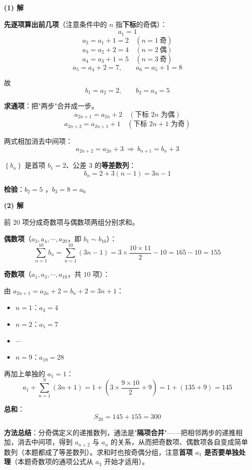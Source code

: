 \par\medskip

\textbf{(1) 解}

\textbf{先逐项算出前几项}（注意条件中的 $n$ 指\textbf{下标}的奇偶）：
\[a_1=1\]
\[a_2=a_1+1=2\quad(n=1\ \text{奇})\]
\[a_3=a_2+2=4\quad(n=2\ \text{偶})\]
\[a_4=a_3+1=5\quad(n=3\ \text{奇})\]
\[a_5=a_4+2=7,\qquad a_6=a_5+1=8\]

故
\[b_1=a_2=2,\qquad b_2=a_4=5\]

\textbf{求通项}：把"两步"合并成一步。
\[a_{2n+1}=a_{2n}+2\quad(\text{下标 }2n\text{ 为偶})\]
\[a_{2n+2}=a_{2n+1}+1\quad(\text{下标 }2n+1\text{ 为奇})\]

两式相加消去中间项：
\[a_{2n+2}=a_{2n}+3\ \Longrightarrow\ b_{n+1}=b_n+3\]

$\left\{b_n\right\}$ 是首项 $b_1=2$、公差 $3$ 的\textbf{等差数列}：
\[b_n=2+3(n-1)=3n-1\]

\textbf{检验}：$b_2=5$ ，$b_3=8=a_6$ 

\par\medskip

\textbf{(2) 解}

前 $20$ 项分成奇数项与偶数项两组分别求和。

\textbf{偶数项}（$a_2,a_4,\cdots,a_{20}$，即 $b_1\sim b_{10}$）：
\[\sum_{n=1}^{10}b_n=\sum_{n=1}^{10}(3n-1)=3\times\frac{10\times11}2-10=165-10=155\]

\textbf{奇数项}（$a_1,a_3,\cdots,a_{19}$，共 $10$ 项）：

由 $a_{2n+1}=a_{2n}+2=b_n+2=3n+1$：
\begin{itemize}
\item $n=1$：$a_3=4$
\item $n=2$：$a_5=7$
\item $\cdots$
\item $n=9$：$a_{19}=28$
\end{itemize}

再加上单独的 $a_1=1$：
\[a_1+\sum_{n=1}^{9}(3n+1)=1+\left(3\times\frac{9\times10}2+9\right)=1+(135+9)=145\]

\textbf{总和}：
\[S_{20}=145+155=300\]


\begin{gktip}
\textbf{方法总结}：分奇偶定义的递推数列，通法是"\textbf{隔项合并}"——把相邻两步的递推相加，消去中间项，得到 $a_{n+2}$ 与 $a_n$ 的关系，从而把奇数项、偶数项各自变成简单数列（本题都成了等差数列）。求和时也按奇偶分组，注意\textbf{首项 $a_1$ 是否要单独处理}（本题奇数项的通项公式从 $a_3$ 开始才适用）。
\end{gktip}

